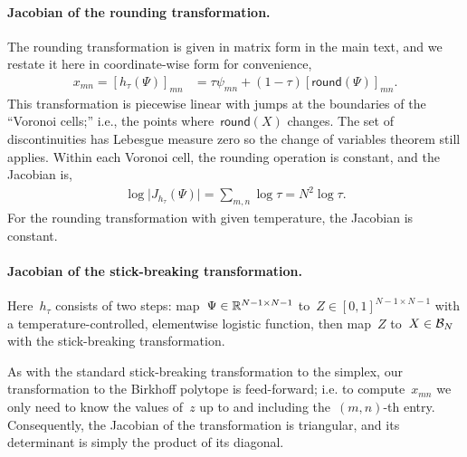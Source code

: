 \documentclass[twoside]{article}
\begin{document}
\paragraph{Jacobian of the rounding transformation.}
The rounding transformation is given in matrix form
in the main text, and we restate it here in coordinate-wise form
for convenience,
\begin{align*}
  x_{mn} = [h_\tau(\Psi)]_{mn} &= \tau \psi_{mn} + (1-\tau) [\mathsf{round}(\Psi)]_{mn}.
\end{align*}
This transformation is piecewise linear with jumps at the boundaries
of the ``Voronoi cells;'' i.e., the points where~$\mathsf{round}(X)$
changes. The set of discontinuities has Lebesgue measure zero so the
change of variables theorem still applies.  Within each Voronoi cell,
the rounding operation is constant, and the Jacobian is,
\begin{align*}
  \log \big| J_{h_\tau}(\Psi) \big| = \sum_{m,n} \log \tau = N^2 \log \tau.
\end{align*}
For the rounding transformation with given temperature, the Jacobian
is constant.

\paragraph{Jacobian of the stick-breaking transformation.}
Here~$h_\tau$ consists of two steps:
map~${\Psi \in \mathbb{R}^{N-1 \times N-1}}$
to~$Z \in [0,1]^{N-1 \times N-1}$ with a temperature-controlled,
elementwise logistic function, then map~$Z$ to~$X \in \mathcal{B}_N$ with the
stick-breaking transformation.

As with the standard stick-breaking transformation to the simplex,
our transformation to the Birkhoff polytope is feed-forward;
i.e. to compute~$x_{mn}$ we only need to know the values of~$z$
up to and including the~$(m,n)$-th entry. Consequently, the
Jacobian of the transformation is triangular, and its determinant
is simply the product of its diagonal.
\end{document}
